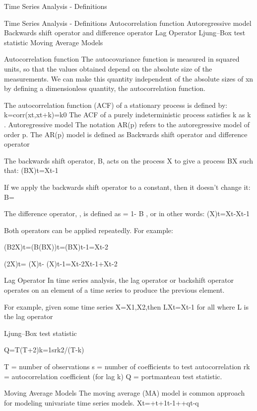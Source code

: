 Time Series Analysis  - Definitions

Time Series Analysis  - Definitions
Autocorrelation function
Autoregressive model
Backwards shift operator and difference operator
Lag Operator
Ljung–Box test statistic
Moving Average Models

Autocorrelation function
The autocovariance function is measured in squared units, so that the values obtained depend on the absolute size of the measurements. We can make this quantity
independent of the absolute sizes of xn by defining a dimensionless quantity, the autocorrelation function.

The autocorrelation function (ACF) of a stationary process is defined by: k=corr(xt,xt+k)=k0
The ACF of a purely indeterministic process satisfies k as k .
Autoregressive model
The notation AR(p) refers to the autoregressive model of order p. The AR(p) model is defined as 
Backwards shift operator and difference operator

The backwards shift operator, B, acts on the process X to give a process BX such that: (BX)t=Xt-1

If we apply the backwards shift operator to a constant, then it doesn’t change it: B=

The difference operator, , is defined as = 1- B , or in other words: (X)t=Xt-Xt-1

Both operators can be applied repeatedly. For example:

	(B2X)t=(B(BX))t=(BX)t-1=Xt-2

	(2X)t= (X)t- (X)t-1=Xt-2Xt-1+Xt-2

	

 Lag Operator
In time series analysis, the lag operator or backshift operator operates on an element of a time series to produce the previous element. 

For example, given some time series X={X1,X2,}then LXt=Xt-1  for all   where L is the lag operator
 
Ljung–Box test statistic
 
Q=T(T+2)k=1srk2/(T-k)
 
T = number of observations
s = number of coefficients to test autocorrelation
rk = autocorrelation coefficient (for lag k)
Q = portmanteau test statistic.
 
Moving Average Models
The moving average (MA) model is common approach for modeling univariate time series models. Xt=+t+1t-1++qt-q


